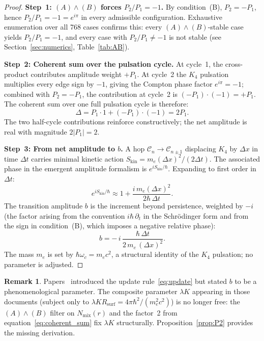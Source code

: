\documentclass[11pt,a4paper]{article}
\theoremstyle{definition}
\newtheorem{remark}[theorem]{Remark}
\newcommand{\Rsurf}{R_{\mathrm{surf}}}
\newcommand{\hb}{\hbar}
\begin{document}
\begin{proof}
\textbf{Step~1: $(A)\wedge(B)$ forces $P_2/P_1 = -1$.} By condition~(B), $P_2 = -P_1$, hence $P_2/P_1 = -1 = e^{i\pi}$ in every admissible configuration. Exhaustive enumeration over all 768 cases confirms this: every $(A)\wedge(B)$-stable case yields $P_2/P_1 = -1$, and every case with $P_2/P_1\ne -1$ is not stable (see Section~\ref{sec:numerics}, Table~\ref{tab:AB}).

\textbf{Step~2: Coherent sum over the pulsation cycle.} At cycle~1, the cross-product contributes amplitude weight $+P_1$. At cycle~2 the $K_4$ pulsation multiplies every edge sign by $-1$, giving the Compton phase factor $e^{i\pi} = -1$; combined with $P_2 = -P_1$, the contribution at cycle~2 is $(-P_1)\cdot(-1) = +P_1$. The coherent sum over one full pulsation cycle is therefore:
\begin{equation}
\Delta = P_1\cdot 1 + (-P_1)\cdot(-1) = 2P_1.
\label{eq:coherent_sum}
\end{equation}
The two half-cycle contributions reinforce constructively; the net amplitude is real with magnitude $2|P_1| = 2$.

\textbf{Step~3: From net amplitude to $b$.} A hop $\mathcal{C}_n\to\mathcal{C}_{n\pm 1}$ displacing $K_4$ by $\Delta x$ in time $\Delta t$ carries minimal kinetic action $S_{\mathrm{kin}} = m_e(\Delta x)^2/(2\Delta t)$. The associated phase in the emergent amplitude formalism is $e^{iS_{\mathrm{kin}}/\hb}$. Expanding to first order in $\Delta t$:
\begin{equation}
e^{iS_{\mathrm{kin}}/\hb} \approx 1 + \frac{i\,m_e(\Delta x)^2}{2\hb\,\Delta t}.
\label{eq:kinphase}
\end{equation}
The transition amplitude $b$ is the increment beyond persistence, weighted by $-i$ (the factor arising from the convention $i\hb\,\partial_t$ in the Schr\"odinger form and from the sign in condition~(B), which imposes a negative relative phase):
\begin{equation}
b = -\,i\,\frac{\hb\,\Delta t}{2\,m_e\,(\Delta x)^2}.
\label{eq:b_derived}
\end{equation}
The mass $m_e$ is set by $\hb\omega_c = m_e c^2$, a structural identity of the $K_4$ pulsation; no parameter is adjusted.
\end{proof}

\begin{remark}
Papers~\cite{Schrodinger_Sketch_2026,Gauss_Faraday_PDL_2026} introduced the update rule~\eqref{eq:update} but stated $b$ to be a phenomenological parameter. The composite parameter $\lambda K$ appearing in those documents (subject only to $\lambda K\Rsurf = 4\pi\hb^2/(m_e^2 c^2)$) is no longer free: the $(A)\wedge(B)$ filter on $N_{\mathrm{mix}}(r)$ and the factor~2 from equation~\eqref{eq:coherent_sum} fix $\lambda K$ structurally. Proposition~\ref{prop:P2} provides the missing derivation.
\end{remark}
\end{document}
